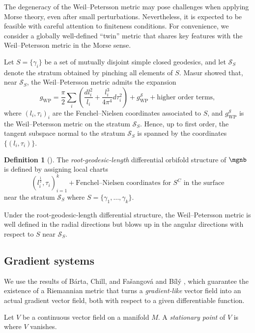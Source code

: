 \documentclass[12pt]{amsart}
\theoremstyle{remark}
\theoremstyle{definition}
\newtheorem{definition}[theorem]{Definition}
\numberwithin{equation}{section}
\begin{document}
The degeneracy of the Weil--Petersson metric may pose challenges when applying Morse theory, even after small perturbations. Nevertheless, it is expected to be feasible with careful attention to finiteness conditions. For convenience, we consider a globally well-defined ``twin'' metric that shares key features with the Weil--Petersson metric in the Morse sense.

Let $S=\{\gamma_i\}$ be a set of mutually disjoint simple closed geodesics, and let $\mathcal S_S$ denote the stratum obtained by pinching all elements of $S$. Masur \cite{masur1976extension} showed that, near $\mathcal S_S$, the Weil--Petersson metric admits the expansion
\[
g_{\text{WP}}=\frac{\pi}{2}\sum_{i}\left( \frac{dl_i^2}{l_i}+\frac{l_i^3}{4\pi^4}d\tau_i^2 \right)+g_{\text{WP}}^{\mathcal S}+\text{higher order terms},
\]
where $(l_i,\tau_i)_{i}$ are the Fenchel--Nielsen coordinates associated to $S$, and $g_{\text{WP}}^{\mathcal S}$ is the Weil--Petersson metric on the stratum $\mathcal S_S$. Hence, up to first order, the tangent subspace normal to the stratum $\mathcal S_S$ is spanned by the coordinates $\{(l_i,\tau_i)\}$.


\begin{definition}[\cite{chen2023morse}]
    The \emph{root-geodesic-length} differential orbifold structure of $\mgnb$ is defined by assigning local charts
    \[
    (l_i^\frac{1}{2},\tau_i)_{i=1}^k + \text{Fenchel--Nielsen coordinates for $S^C$ in the surface}
    \]
    near the stratum $\mathcal S_S$ where $S=\{\gamma_1,\dots,\gamma_k\}$.
\end{definition}

Under the root-geodesic-length differential structure, the Weil--Petersson metric is well defined in the radial directions but blows up in the angular directions with respect to $S$ near $\mathcal S_S$.


\subsection{Gradient systems}

We use the results of Bárta, Chill, and Fašangová \cite{barta2012every} and Bílý \cite{bily2014transformations}, which guarantee the existence of a Riemannian metric that turns a \emph{gradient-like} vector field into an actual gradient vector field, both with respect to a given differentiable function.

Let $V$ be a continuous vector field on a manifold $M$. A \emph{stationary point} of $V$ is where $V$ vanishes.
\end{document}
